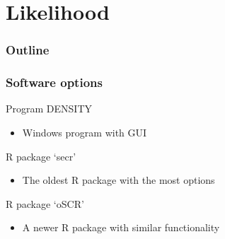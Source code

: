 \documentclass[color=usenames,dvipsnames]{beamer}\usepackage[]{graphicx}\usepackage[]{color}
\begin{document}











\section{Likelihood}



\begin{frame}
  \frametitle{Outline}
  \Large
  \tableofcontents[currentsection]
\end{frame}




\begin{frame}
  \frametitle{Software options}
  Program DENSITY
  \begin{itemize}
    \item Windows program with GUI
  \end{itemize}
  \vfill
  R package `secr'
  \begin{itemize}
    \item The oldest R package with the most options
  \end{itemize}
  \vfill
  R package `oSCR'
  \begin{itemize}
    \item A newer R package with similar functionality
  \end{itemize}
\end{frame}
\end{document}
